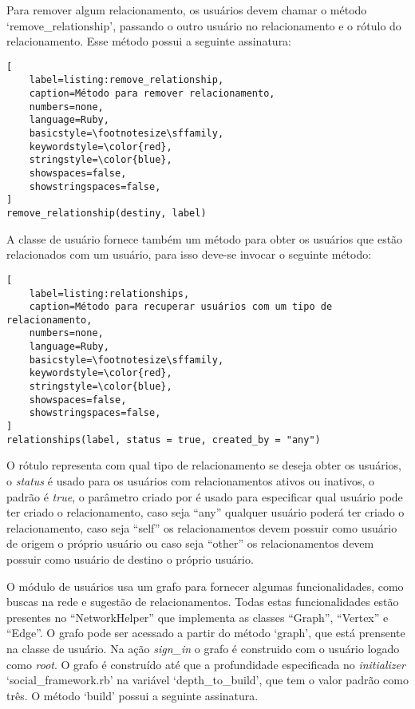 Para remover algum relacionamento, os usuários devem chamar o método `remove\_relationship', passando o outro usuário no relacionamento e o rótulo do relacionamento. Esse método possui a seguinte assinatura:

\begin{lstlisting}[
    label=listing:remove_relationship,
    caption=Método para remover relacionamento,
    numbers=none,
    language=Ruby,
    basicstyle=\footnotesize\sffamily,
    keywordstyle=\color{red},
    stringstyle=\color{blue},
    showspaces=false,
    showstringspaces=false,
]
remove_relationship(destiny, label)
\end{lstlisting}

A classe de usuário fornece também um método para obter os usuários que estão relacionados com um usuário, para isso deve-se invocar o seguinte método:

\begin{lstlisting}[
    label=listing:relationships,
    caption=Método para recuperar usuários com um tipo de relacionamento,
    numbers=none,
    language=Ruby,
    basicstyle=\footnotesize\sffamily,
    keywordstyle=\color{red},
    stringstyle=\color{blue},
    showspaces=false,
    showstringspaces=false,
]
relationships(label, status = true, created_by = "any")
\end{lstlisting}

O rótulo representa com qual tipo de relacionamento se deseja obter os usuários, o \textit{status} é usado para os usuários com relacionamentos ativos ou inativos, o padrão é \textit{true}, o parâmetro criado por é usado para especificar qual usuário pode ter criado o relacionamento, caso seja ``any'' qualquer usuário poderá ter criado o relacionamento, caso seja ``self'' os relacionamentos devem possuir como usuário de origem o próprio usuário ou caso seja ``other'' os relacionamentos devem possuir como usuário de destino o próprio usuário.

O módulo de usuários usa um grafo para fornecer algumas funcionalidades, como buscas na rede e sugestão de relacionamentos. Todas estas funcionalidades estão presentes no ``NetworkHelper'' que implementa as classes ``Graph'', ``Vertex'' e ``Edge''. O grafo pode ser acessado a partir do método `graph', que está prensente na classe de usuário. Na ação \textit{sign\_in} o grafo é construido com o usuário logado como \textit{root}. O grafo é construído até que a profundidade especificada no \textit{initializer} `social\_framework.rb' na variável `depth\_to\_build', que tem o valor padrão como três. O método `build' possui a seguinte assinatura.

